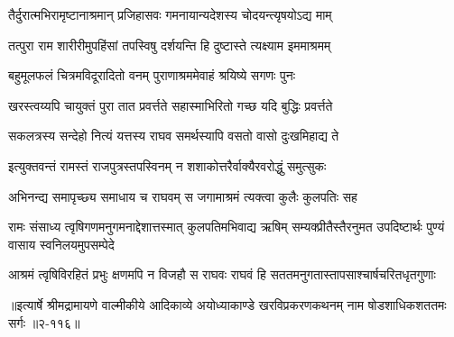 \twolineshloka
{तैर्दुरात्मभिरामृष्टानाश्रमान् प्रजिहासवः}
{गमनायान्यदेशस्य चोदयन्त्यृषयोऽद्य माम्} %

\twolineshloka
{तत्पुरा राम शारीरीमुपहिंसां तपस्विषु}
{दर्शयन्ति हि दुष्टास्ते त्यक्ष्याम इममाश्रमम्} %

\twolineshloka
{बहुमूलफलं चित्रमविदूरादितो वनम्}
{पुराणाश्रममेवाहं श्रयिष्ये सगणः पुनः} %

\twolineshloka
{खरस्त्वय्यपि चायुक्तं पुरा तात प्रवर्त्तते}
{सहास्माभिरितो गच्छ यदि बुद्धिः प्रवर्त्तते} %

\twolineshloka
{सकलत्रस्य सन्देहो नित्यं यत्तस्य राघव}
{समर्थस्यापि वसतो वासो दुःखमिहाद्य ते} %

\twolineshloka
{इत्युक्तवन्तं रामस्तं राजपुत्रस्तपस्विनम्}
{न शशाकोत्तरैर्वाक्यैरवरोद्धुं समुत्सुकः} %

\twolineshloka
{अभिनन्द्य समापृच्छ्य समाधाय च राघवम्}
{स जगामाश्रमं त्यक्त्वा कुलैः कुलपतिः सह} %

\twolineshloka
{रामः संसाध्य त्वृषिगणमनुगमनाद्देशात्तस्मात् कुलपतिमभिवाद्य ऋषिम्}
{सम्यक्प्रीतैस्तैरनुमत उपदिष्टार्थः पुण्यं वासाय स्वनिलयमुपसम्पेदे} %

\twolineshloka
{आश्रमं त्वृषिविरहितं प्रभुः क्षणमपि न विजहौ स राघवः}
{राघवं हि सततमनुगतास्तापसाश्चार्षचरितधृतगुणाः} %


॥इत्यार्षे श्रीमद्रामायणे वाल्मीकीये आदिकाव्ये अयोध्याकाण्डे खरविप्रकरणकथनम् नाम षोडशाधिकशततमः सर्गः ॥२-११६॥
